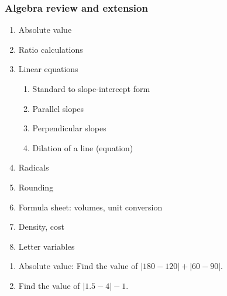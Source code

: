 \documentclass[12pt, twoside]{article}
\begin{document}
\subsubsection*{Algebra review and extension}
  \begin{enumerate}
  \item Absolute value
  \item Ratio calculations
  \item Linear equations
  \begin{enumerate}
    \item Standard to slope-intercept form
    \item Parallel slopes
    \item Perpendicular slopes
    \item Dilation of a line (equation)
    \end{enumerate}
  \item Radicals
  \item Rounding
  \item Formula sheet: volumes, unit conversion
  \item Density, cost
  \item Letter variables
  \end{enumerate}

  \begin{enumerate}
    \subsubsection*{Absolute value}
    \item Absolute value: Find the value of $|180-120|+|60-90|$. %
    \item Find the value of $|1.5-4|-1$.


  \end{enumerate}
\end{document}
